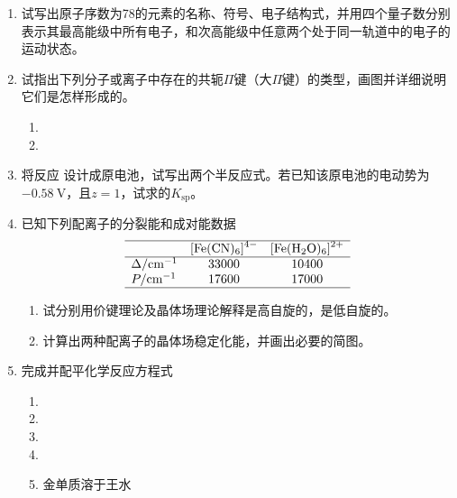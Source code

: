 \begin{enumerate}[label=\arabic*., start=1, itemsep=1.5ex]
    \item 试写出原子序数为78的元素的名称、符号、电子结构式，并用四个量子数分别表示其最高能级中所有电子，和次高能级中任意两个处于同一轨道中的电子的运动状态。
    \item 试指出下列分子或离子中存在的共轭$\Pi$键（大$\Pi$键）的类型，画图并详细说明它们是怎样形成的。
    \begin{enumerate}[label=(\arabic*), itemsep=1ex]
        \item {}
        \item {}
    \end{enumerate}
    \item 将反应  设计成原电池，试写出两个半反应式。若已知该原电池的电动势为$-0.58\ \text{V}$，且$z=1$，试求的$K_{\text{sp}}$。
    \item 已知下列配离子的分裂能和成对能数据
    \[
    \begin{array}{lcc}
    \hline
     & \ce{[Fe(CN)6]^{4-}} & \ce{[Fe(H2O)6]^{2+}} \\
    \hline
    \Delta/\text{cm}^{-1} & 33000 & 10400 \\
    P/\text{cm}^{-1} & 17600 & 17000 \\
    \hline
    \end{array}
    \]
    \begin{enumerate}[label=(\arabic*), itemsep=1ex]
        \item 试分别用价键理论及晶体场理论解释是高自旋的，是低自旋的。
        \item 计算出两种配离子的晶体场稳定化能，并画出必要的简图。
    \end{enumerate}
    \item 完成并配平化学反应方程式
    \begin{enumerate}[label=(\arabic*), itemsep=1ex]
        \item {}
        \item {}
        \item {}
        \item {}
        \item 金单质溶于王水
    \end{enumerate}


\end{enumerate}
